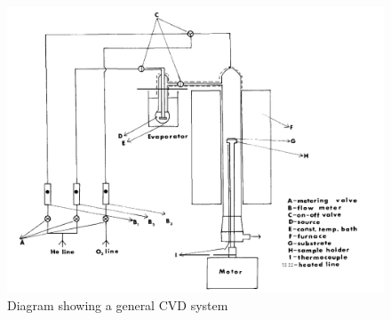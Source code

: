 \documentclass[letterpaper, 12 pt, conference]{ieeeconf}  %
\begin{document}
\begin{figure}[H]
    \centering
    \includegraphics[width=.9\linewidth]{Screen Shot 2022-03-03 at 7.35.34 PM.png}
    \caption{Diagram showing a general CVD system \cite{c9} }
    \label{fig:knngraph1}
\end{figure}
\end{document}
